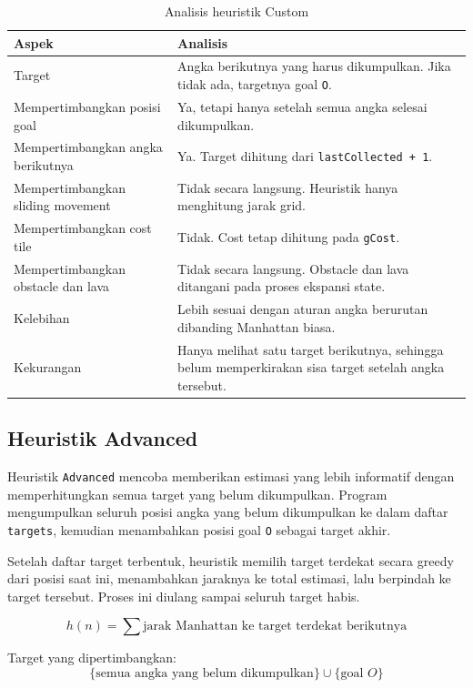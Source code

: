 \begin{table}[H]
	\centering
	\caption{Analisis heuristik Custom}
	\begin{tabular}{|p{4cm}|p{10cm}|}
		\hline
		\rowcolor{orange!20}
		\textbf{Aspek} & \textbf{Analisis} \\
		\hline
		Target & Angka berikutnya yang harus dikumpulkan. Jika tidak ada, targetnya goal \texttt{O}. \\
		\hline
		Mempertimbangkan posisi goal & Ya, tetapi hanya setelah semua angka selesai dikumpulkan. \\
		\hline
		Mempertimbangkan angka berikutnya & Ya. Target dihitung dari \texttt{lastCollected + 1}. \\
		\hline
		Mempertimbangkan sliding movement & Tidak secara langsung. Heuristik hanya menghitung jarak grid. \\
		\hline
		Mempertimbangkan cost tile & Tidak. Cost tetap dihitung pada \texttt{gCost}. \\
		\hline
		Mempertimbangkan obstacle dan lava & Tidak secara langsung. Obstacle dan lava ditangani pada proses ekspansi state. \\
		\hline
		Kelebihan & Lebih sesuai dengan aturan angka berurutan dibanding Manhattan biasa. \\
		\hline
		Kekurangan & Hanya melihat satu target berikutnya, sehingga belum memperkirakan sisa target setelah angka tersebut. \\
		\hline
	\end{tabular}
\end{table}

\subsection{Heuristik Advanced}

Heuristik \texttt{Advanced} mencoba memberikan estimasi yang lebih informatif dengan memperhitungkan semua target yang belum dikumpulkan. 
Program mengumpulkan seluruh posisi angka yang belum dikumpulkan ke dalam daftar \texttt{targets}, kemudian menambahkan posisi goal \texttt{O} sebagai target akhir.

Setelah daftar target terbentuk, heuristik memilih target terdekat secara greedy dari posisi saat ini, menambahkan jaraknya ke total estimasi, lalu berpindah ke target tersebut. 
Proses ini diulang sampai seluruh target habis.

\begin{tcolorbox}[
	colback=orange!5,
	colframe=orange!70!black,
	title=\textbf{Ide Heuristik Advanced},
	arc=2mm,
	boxrule=0.8pt
]
\[
	h(n)=\sum \text{jarak Manhattan ke target terdekat berikutnya}
\]

Target yang dipertimbangkan:
\[
	\{\text{semua angka yang belum dikumpulkan}\} \cup \{\text{goal } O\}
\]
\end{tcolorbox}

